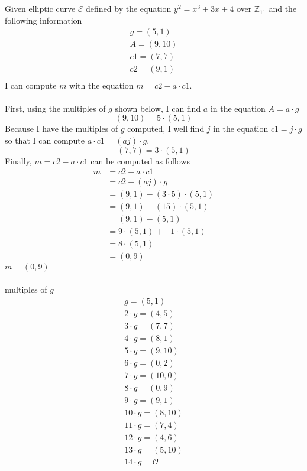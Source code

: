 \documentclass{article}
\begin{document}
\section{}
Given elliptic curve $\mathcal{E}$ defined by the equation $y^2 = x^3 + 3x + 4$ over $\mathbb{Z}_{11}$
and the following information
\[
\begin{split}
g = (5, 1) \\
A = (9, 10) \\
c1 = (7, 7) \\
c2 = (9, 1) \\
\end{split}
\]
I can compute $m$ with the equation $m = c2 - a\cdot c1$.
\\
\\
First, using the multiples of $g$ shown below, I can find $a$ in the equation $A = a\cdot g$
\[
(9, 10) = 5 \cdot (5, 1)
\]
Because I have the  multiples of $g$ computed, I well find $j$ in the equation 
$c1 = j\cdot g$ so that I can compute $a\cdot c1 = (aj)\cdot g$.
\[
(7, 7) = 3 \cdot (5, 1)
\]
Finally, $m = c2 - a\cdot c1$ can be computed as follows
\[
\begin{split}
m &=c2 - a\cdot c1 \\
&=c2 - (aj)\cdot g \\
&=(9,1) - (3 \cdot 5)\cdot (5, 1) \\
&=(9,1) - (15)\cdot (5, 1) \\
&=(9,1) - (5, 1) \\
&=9\cdot(5,1) + -1\cdot(5, 1) \\
&=8\cdot(5,1) \\
&=(0, 9)
\end{split}
\]
$m = (0, 9)$
\\
\\
multiples of $g$
\[
\begin{split}
g = (5, 1) \\
2\cdot g = (4, 5) \\
3\cdot g = (7, 7) \\
4\cdot g = (8, 1) \\
5\cdot g = (9, 10) \\
6\cdot g = (0, 2) \\
7\cdot g = (10, 0) \\
8\cdot g = (0, 9) \\
9\cdot g = (9, 1) \\
10\cdot g = (8, 10) \\
11\cdot g = (7, 4) \\
12\cdot g = (4, 6) \\
13\cdot g = (5, 10) \\
14\cdot g = \mathcal{O}\\
\end{split}
\]
\end{document}
